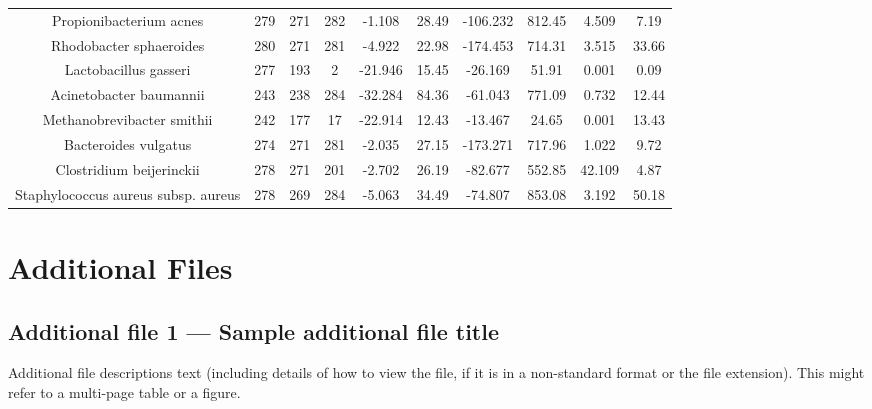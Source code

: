 \documentclass[10pt]{bmc_article}
\newenvironment{bmcformat}{\begin{raggedright}\baselineskip20pt\sloppy\setboolean{publ}{false}}{\end{raggedright}\baselineskip20pt\sloppy}
\begin{document}
\begin{bmcformat}
{\begin{tabular}{|c|c|c|c|c|c|c|c|c|c|}
        Propionibacterium acnes & 279 & 271 & 282 & -1.108 & 28.49 & -106.232 & 812.45 & 4.509 & 7.19 \\
        Rhodobacter sphaeroides & 280 & 271 & 281 & -4.922 & 22.98 & -174.453 & 714.31 & 3.515 & 33.66 \\
        Lactobacillus gasseri & 277 & 193 & 2 & -21.946 & 15.45 & -26.169 & 51.91 & 0.001 & 0.09 \\
        Acinetobacter baumannii & 243 & 238 & 284 & -32.284 & 84.36 & -61.043 & 771.09 & 0.732 & 12.44 \\
        Methanobrevibacter smithii & 242 & 177 & 17 & -22.914 & 12.43 & -13.467 & 24.65 & 0.001 & 13.43 \\
        Bacteroides vulgatus & 274 & 271 & 281 & -2.035 & 27.15 & -173.271 & 717.96 & 1.022 & 9.72 \\
        Clostridium beijerinckii & 278 & 271 & 201 & -2.702 & 26.19 & -82.677 & 552.85 & 42.109 & 4.87 \\
        Staphylococcus aureus subsp. aureus & 278 & 269 & 284 & -5.063 & 34.49 & -74.807 & 853.08 & 3.192 & 50.18 \\
        \hline
      \end{tabular}
    }



\section*{Additional Files}
  \subsection*{Additional file 1 --- Sample additional file title}
    Additional file descriptions text (including details of how to
    view the file, if it is in a non-standard format or the file extension).  This might
    refer to a multi-page table or a figure.


\end{bmcformat}
\end{document}
